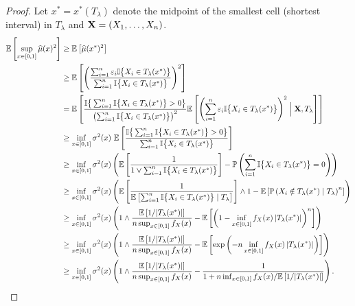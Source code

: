 \documentclass{article}
\begin{document}
\begin{proof}
  Let $x^* = x^*(T_\lambda)$ denote the midpoint of the smallest
  cell (shortest interval) in $T_\lambda$
  and $\mathbf{X} = (X_1, \ldots, X_n)$.
  \begin{align*}
    \mathbb{E}\left[
    \sup_{x \in [0,1]}
    \widehat\mu(x)^2
    \right]
    &\geq
      \mathbb{E}\left[
      \widehat\mu(x^*)^2
      \right] \\
    &\geq
      \mathbb{E}\left[
      \left(
      \frac{\sum_{i=1}^n \varepsilon_i
      \mathbb{I}\big\{ X_i \in T_\lambda(x^*) \big\}}
      {\sum_{i=1}^n
      \mathbb{I}\big\{ X_i \in T_\lambda(x^*) \big\}}
      \right)^2
      \right] \\
    &=
      \mathbb{E}\left[
      \frac{\mathbb{I}\big\{\sum_{i=1}^n
      \mathbb{I}\big\{ X_i \in T_\lambda(x^*) \big\} > 0 \big\}}
      {\left(\sum_{i=1}^n \mathbb{I}\big\{ X_i \in T_\lambda(x^*) \big\} \right)^2}
      \mathbb{E}\left[
      \left(
      \sum_{i=1}^n \varepsilon_i
      \mathbb{I}\big\{ X_i \in T_\lambda(x^*) \big\}
      \right)^2
      \Bigm| \mathbf{X}, T_\lambda
      \right]
      \right] \\
    &\geq
      \inf_{x \in [0,1]} \sigma^2(x) \
      \mathbb{E}\left[
      \frac{\mathbb{I}\big\{\sum_{i=1}^n
      \mathbb{I}\big\{ X_i \in T_\lambda(x^*) \big\} > 0 \big\}}
      {\sum_{i=1}^n \mathbb{I}\big\{ X_i \in T_\lambda(x^*) \big\}}
      \right] \\
    &\geq
      \inf_{x \in [0,1]} \sigma^2(x)
      \left(
      \mathbb{E}\left[
      \frac{1}
      {1 \vee \sum_{i=1}^n \mathbb{I}\big\{ X_i \in T_\lambda(x^*) \big\}}
      \right]
      - \mathbb{P}\left(
      \sum_{i=1}^n \mathbb{I}\big\{ X_i \in T_\lambda(x^*) \big\} = 0
      \right)
      \right)
    \\
    &\geq
      \inf_{x \in [0,1]} \sigma^2(x)
      \left(
      \mathbb{E}\left[
      \frac{1}
      {\mathbb{E}\left[\sum_{i=1}^n \mathbb{I}\big\{ X_i \in T_\lambda(x^*) \big\}
      \mid T_\lambda \right]}
      \right] \wedge 1
      - \mathbb{E}\left[
      \mathbb{P}\left(
      X_i \notin T_\lambda(x^*)
      \mid T_\lambda
      \right)^n
      \right]
      \right)
      \\
    &\geq
      \inf_{x \in [0,1]} \sigma^2(x)
      \left(
      1 \wedge
      \frac{\mathbb{E}\left[1/ |T_\lambda(x^*)| \right]}
      {n \sup_{x \in [0,1]} f_X(x)}
      - \mathbb{E}\left[
      \left(
      1 - \inf_{x \in [0,1]} f_X(x)\, |T_\lambda(x^*)|
      \right)^n
      \right]
      \right) \\
    &\geq
      \inf_{x \in [0,1]} \sigma^2(x)
      \left(
      1 \wedge
      \frac{\mathbb{E}\left[1/ |T_\lambda(x^*)| \right]}
      {n \sup_{x \in [0,1]} f_X(x)}
      - \mathbb{E}\left[
      \exp\left(
      - n \inf_{x \in [0,1]} f_X(x)\, |T_\lambda(x^*)|
      \right)
      \right]
      \right) \\
    &\geq
      \inf_{x \in [0,1]} \sigma^2(x)
      \left(
      1 \wedge
      \frac{\mathbb{E}\left[1/ |T_\lambda(x^*)| \right]}
      {n \sup_{x \in [0,1]} f_X(x)}
      - \frac{1}
      {1 + n \inf_{x \in [0,1]} f_X(x) /
      \mathbb{E}\left[1/ |T_\lambda(x^*)| \right]}
      \right).
  \end{align*}


\end{proof}
\end{document}
